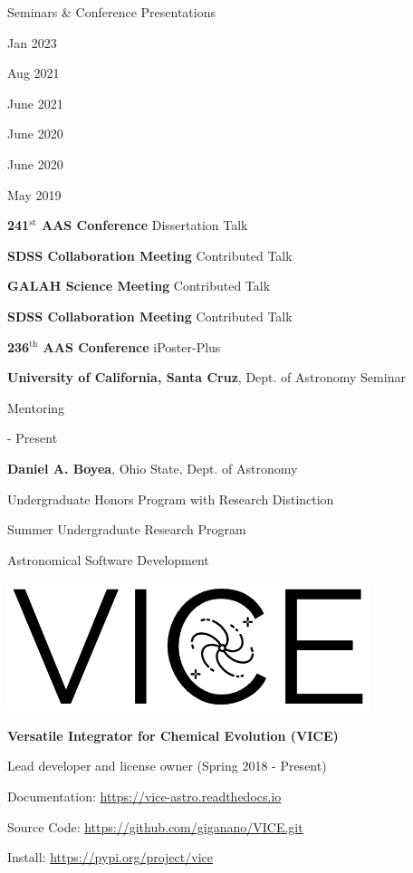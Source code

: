 \documentclass[cv.tex]{subfiles}
\begin{document}
\vspace{5mm}
\noindent
{\color{themecolor} \large Seminars \& Conference Presentations}
\par\noindent
\parbox{0.18\textwidth}{%
	\raggedleft
	Jan 2023 \par
	Aug 2021 \par
	June 2021 \par
	June 2020 \par
	June 2020 \par
	May 2019 \par
}
\hspace{1mm}
\parbox{0.8\textwidth}{%
	\textbf{241$^\text{st}$ AAS Conference} \hfill Dissertation Talk \par
	\textbf{SDSS Collaboration Meeting} \hfill Contributed Talk \par
	\textbf{GALAH Science Meeting} \hfill Contributed Talk \par
	\textbf{SDSS Collaboration Meeting} \hfill Contributed Talk \par
	\textbf{236$^\text{th}$ AAS Conference} \hfill iPoster-Plus \par
	\textbf{University of California, Santa Cruz}, Dept. of Astronomy \hfill
	Seminar \par
}

\vspace{5mm}
\noindent
{\color{themecolor} \large Mentoring}
\par\noindent
\parbox{0.18\textwidth}{%
	 - Present \par
	\null \par
	\null
}
\hspace{1mm}
\parbox{0.8\textwidth}{%
	\vspace{1mm}
	\textbf{Daniel A. Boyea}, Ohio State, Dept. of Astronomy \par
	Undergraduate Honors Program with Research Distinction \par
	Summer Undergraduate Research Program
}

\vspace{5mm}
\noindent
{%
{\color{themecolor}\large Astronomical Software Development}
\par\noindent
\parbox{0.35\textwidth}{%
	\centering
	\includegraphics[scale = 0.33]{vice-logo.png}
}
\parbox{0.63\textwidth}{%
	\textbf{Versatile Integrator for Chemical Evolution (VICE)} \par
	Lead developer and license owner (Spring 2018 - Present) \par
	Documentation: \url{https://vice-astro.readthedocs.io} \par
	Source Code: \url{https://github.com/giganano/VICE.git} \par
	Install: \url{https://pypi.org/project/vice}
}
}
\end{document}
